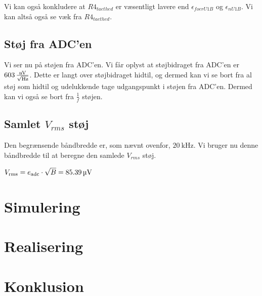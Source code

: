 \documentclass[a4paper, 11pt, article,oneside,openany]{memoir} %
\newcommand{\tsub}[1]{_{\textup{#1}}}
\begin{document}
Vi kan også konkludere at $R4_{taethed}$ er væsentligt lavere end $\epsilon_{foerU1B}$ og $\epsilon_{nU1B}$. Vi kan altså også se væk fra $R4_{taethed}$.


\subsection{Støj fra ADC'en}

Vi ser nu på støjen fra ADC'en. Vi får oplyst at støjbidraget fra ADC'en er $\SI{603}{\frac{\nano\volt}{\sqrt{\hertz}}}$. Dette er langt over støjbidraget hidtil, og dermed kan vi se bort fra al støj som hidtil og udelukkende tage udgangspunkt i støjen fra ADC'en. Dermed kan vi også se bort fra $\frac{1}{f}$ støjen.

\clearpage

\subsection{Samlet $V_{rms}$ støj}

Den begrænsende båndbredde er, som nævnt ovenfor, $\SI{20}{\kilo\hertz}$. Vi bruger nu denne båndbredde til at beregne den samlede $V_{rms}$ støj. 

$V\tsub{rms} = e\tsub{adc} \cdot \sqrt{B} = \SI{85.39}{\micro\volt}$

\section{Simulering}

\section{Realisering}

\section{Konklusion}
\end{document}

